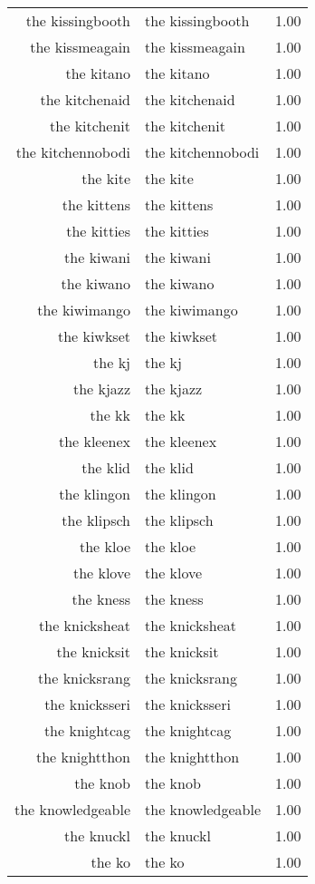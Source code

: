 \begin{table}[ht]
\begin{tabular}{rlr}
  the kissingbooth & the kissingbooth & 1.00 \\ 
  the kissmeagain & the kissmeagain & 1.00 \\ 
  the kitano & the kitano & 1.00 \\ 
  the kitchenaid & the kitchenaid & 1.00 \\ 
  the kitchenit & the kitchenit & 1.00 \\ 
  the kitchennobodi & the kitchennobodi & 1.00 \\ 
  the kite & the kite & 1.00 \\ 
  the kittens & the kittens & 1.00 \\ 
  the kitties & the kitties & 1.00 \\ 
  the kiwani & the kiwani & 1.00 \\ 
  the kiwano & the kiwano & 1.00 \\ 
  the kiwimango & the kiwimango & 1.00 \\ 
  the kiwkset & the kiwkset & 1.00 \\ 
  the kj & the kj & 1.00 \\ 
  the kjazz & the kjazz & 1.00 \\ 
  the kk & the kk & 1.00 \\ 
  the kleenex & the kleenex & 1.00 \\ 
  the klid & the klid & 1.00 \\ 
  the klingon & the klingon & 1.00 \\ 
  the klipsch & the klipsch & 1.00 \\ 
  the kloe & the kloe & 1.00 \\ 
  the klove & the klove & 1.00 \\ 
  the kness & the kness & 1.00 \\ 
  the knicksheat & the knicksheat & 1.00 \\ 
  the knicksit & the knicksit & 1.00 \\ 
  the knicksrang & the knicksrang & 1.00 \\ 
  the knicksseri & the knicksseri & 1.00 \\ 
  the knightcag & the knightcag & 1.00 \\ 
  the knightthon & the knightthon & 1.00 \\ 
  the knob & the knob & 1.00 \\ 
  the knowledgeable & the knowledgeable & 1.00 \\ 
  the knuckl & the knuckl & 1.00 \\ 
  the ko & the ko & 1.00 \\ 

\end{tabular}
\end{table}
